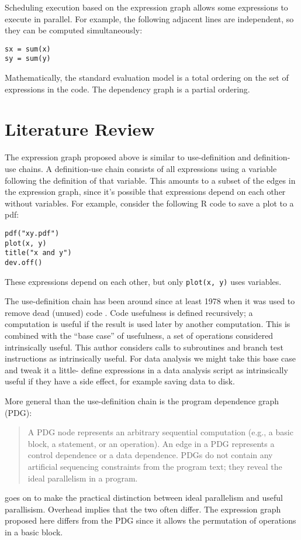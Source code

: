 \documentclass[12pt]{article}
\begin{document}
Scheduling execution based on the expression graph allows some expressions to execute in
parallel. For example, the following adjacent lines are independent, so
they can be computed simultaneously:

\begin{verbatim}
sx = sum(x)
sy = sum(y)
\end{verbatim}

Mathematically, the standard evaluation model is a total ordering on the
set of expressions in the code. The dependency graph is a partial ordering.

\section{Literature Review}
\label{sec:lit}

The expression graph proposed above is similar to 
use-definition and definition-use chains. A definition-use chain consists
of all expressions using a variable following the definition of that
variable. This amounts to a subset of the edges in the expression graph,
since it's possible that expressions depend on each other without
variables. For example, consider the following R code to save a plot to a
pdf:
\begin{verbatim}
pdf("xy.pdf")
plot(x, y)
title("x and y")
dev.off()
\end{verbatim}
These expressions depend on each other, but only \texttt{plot(x, y)} uses variables.

The use-definition chain has been around since at least 1978
when it was used to remove dead (unused) code \cite{kennedy1978use}.
Code usefulness is defined recursively; a computation is useful if the result is
used later by another computation. This is combined with the ``base case''
of usefulness, a set of operations considered
intrinsically useful. This author considers calls to subroutines and branch
test instructions as intrinsically useful. For data analysis we might take
this base case and tweak it a little- define expressions in a data analysis
script as intrinsically useful if they have a side effect, for example
saving data to disk.

More general than the use-definition chain is the program dependence graph (PDG)\cite{ferrante1987}:
\begin{quote}
    A PDG node represents
    an arbitrary sequential computation (e.g., a basic block, a
    statement, or an operation). An edge in a PDG represents
    a control dependence or a data dependence. PDGs do not
    contain any artificial sequencing constraints from the
    program text; they reveal the ideal parallelism in a
    program. \cite{sarkar1991automatic} 
\end{quote}
\cite{sarkar1991automatic} goes on to make the practical distinction between ideal
parallelism and useful parallisism. Overhead implies that the two often
differ.
The expression graph proposed here differs from the PDG since it allows the permutation of
operations in a basic block.
\end{document}
